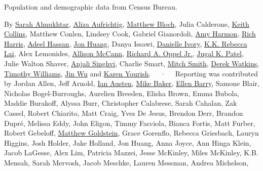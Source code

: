 Population and demographic data from Census Bureau.

By \href{https://www.nytimes3xbfgragh.onion/by/sarah-almukhtar}{Sarah
Almukhtar},
\href{https://www.nytimes3xbfgragh.onion/by/aliza-aufrichtig}{Aliza
Aufrichtig},
\href{https://www.nytimes3xbfgragh.onion/by/matthew-bloch}{Matthew
Bloch}, Julia Calderone,
\href{https://www.nytimes3xbfgragh.onion/by/keith-collins}{Keith
Collins}, Matthew Conlen, Lindsey Cook, Gabriel Gianordoli,
\href{https://www.nytimes3xbfgragh.onion/by/amy-harmon}{Amy Harmon},
\href{https://www.nytimes3xbfgragh.onion/by/rich-harris}{Rich Harris},
\href{https://www.nytimes3xbfgragh.onion/by/adeel-hassan}{Adeel Hassan},
\href{https://www.nytimes3xbfgragh.onion/by/jon-huang}{Jon Huang}, Danya
Issawi,
\href{https://www.nytimes3xbfgragh.onion/by/danielle-ivory}{Danielle
Ivory}, \href{https://www.nytimes3xbfgragh.onion/by/kk-rebecca-lai}{K.K.
Rebecca Lai}, Alex Lemonides,
\href{https://www.nytimes3xbfgragh.onion/by/allison-mccann}{Allison
McCann},
\href{https://www.nytimes3xbfgragh.onion/by/richard-a-oppel-jr}{Richard
A. Oppel Jr.},
\href{https://www.nytimes3xbfgragh.onion/by/jugal-k-patel}{Jugal K.
Patel}, Julie Walton Shaver,
\href{https://www.nytimes3xbfgragh.onion/by/anjali-singhvi}{Anjali
Singhvi}, Charlie Smart,
\href{https://www.nytimes3xbfgragh.onion/by/mitch-smith}{Mitch Smith},
\href{https://www.nytimes3xbfgragh.onion/by/derek-watkins}{Derek
Watkins},
\href{https://www.nytimes3xbfgragh.onion/by/timothy-williams}{Timothy
Williams}, \href{https://www.nytimes3xbfgragh.onion/by/jin-wu}{Jin Wu}
and \href{https://www.nytimes3xbfgragh.onion/by/karen-yourish}{Karen
Yourish}. ~~·~~ Reporting was contributed by Jordan Allen, Jeff Arnold,
\href{https://www.nytimes3xbfgragh.onion/by/ian-austen}{Ian Austen},
\href{https://www.nytimes3xbfgragh.onion/by/mike-baker}{Mike Baker},
\href{https://www.nytimes3xbfgragh.onion/by/ellen-barry}{Ellen Barry},
Samone Blair, Nicholas Bogel-Burroughs, Aurelien Breeden, Elisha Brown,
Emma Bubola, Maddie Burakoff, Alyssa Burr, Christopher Calabrese, Sarah
Cahalan, Zak Cassel, Robert Chiarito, Matt Craig, Yves De Jesus, Brendon
Derr, Brandon Dupré, Melissa Eddy, John Eligon, Timmy Facciola, Bianca
Fortis, Matt Furber, Robert Gebeloff,
\href{https://www.nytimes3xbfgragh.onion/by/matthew-goldstein}{Matthew
Goldstein}, Grace Gorenflo, Rebecca Griesbach, Lauryn Higgins, Josh
Holder, Jake Holland, Jon Huang, Anna Joyce, Ann Hinga Klein, Jacob
LaGesse, Alex Lim, Patricia Mazzei, Jesse McKinley, Miles McKinley, K.B.
Mensah, Sarah Mervosh, Jacob Meschke, Lauren Messman, Andrea Michelson,

